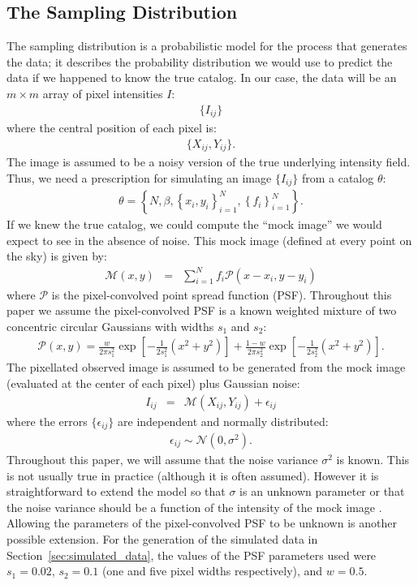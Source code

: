 \documentclass[manuscript]{aastex}
\begin{document}
\subsection{The Sampling Distribution}
The sampling distribution is a probabilistic model for the process that
generates the data; it describes the probability distribution we would use
to predict the data if we happened to know the true catalog. In our case,
the data will be an $m \times m$ array of pixel intensities $I$:
\begin{eqnarray}
\{I_{ij}\}
\end{eqnarray}
where the central position of each pixel is:
\begin{eqnarray}
\{X_{ij}, Y_{ij}\}.
\end{eqnarray}
The image is assumed to be a noisy version of the true underlying intensity
field. Thus, we need
a prescription for simulating an image $\{I_{ij}\}$ from a catalog $\theta$:
\begin{eqnarray}
\theta = \left\{N, \beta, \left\{x_i, y_i\right\}_{i=1}^N, 
\left\{f_i\right\}_{i=1}^N\right\}.
\end{eqnarray}
If we knew the true catalog, we could compute the
``mock image'' we would expect to see
in the absence of noise. This mock image (defined at every point on the sky)
is given by:
\begin{eqnarray}
\mathcal{M}(x, y) &=& \sum_{i=1}^N f_i \mathcal{P}(x - x_i, y - y_i)
\end{eqnarray}
where $\mathcal{P}$ is the pixel-convolved point spread function (PSF).
Throughout this paper we
assume the pixel-convolved PSF is a known weighted mixture of two concentric
circular
Gaussians with widths $s_1$ and $s_2$:
\begin{eqnarray}
\mathcal{P}(x, y) = \frac{w}{2\pi s_1^2}\exp
\left[
-\frac{1}{2s_1^2}\left(x^2 + y^2\right)
\right]
+ \frac{1-w}{2\pi s_2^2}\exp
\left[-\frac{1}{2s_2^2}\left(x^2 + y^2\right)
\right].
\end{eqnarray}
The pixellated observed image is assumed to be generated from the mock
image (evaluated at the center of each pixel) plus Gaussian noise:
\begin{eqnarray}
I_{ij} &=& \mathcal{M}(X_{ij}, Y_{ij}) + \epsilon_{ij}
\end{eqnarray}
where the errors $\{\epsilon_{ij}\}$ are independent and normally distributed:
\begin{eqnarray}
\epsilon_{ij} \sim \mathcal{N}(0, \sigma^2).
\end{eqnarray}
Throughout this paper, we will assume that the noise variance $\sigma^2$ is
known. This is not usually true in practice (although it is often assumed).
However it is straightforward to extend the model so that $\sigma$ is an
unknown parameter or that the noise variance should be a function of the
intensity of the mock image \citep[e.g.][]{2011MNRAS.412.2521B}. Allowing
the parameters of the pixel-convolved PSF to be unknown is another possible
extension. For the generation of the simulated data in Section~\ref{sec:simulated_data},
the values of the PSF parameters used were $s_1=0.02$, $s_2=0.1$ (one and
five pixel widths respectively), and $w=0.5$. 
\end{document}
